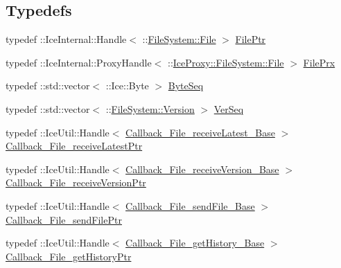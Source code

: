 \subsection*{Typedefs}
\begin{DoxyCompactItemize}
\item 
typedef \+::Ice\+Internal\+::\+Handle$<$ \+::\hyperlink{class_file_system_1_1_file}{File\+System\+::\+File} $>$ \hyperlink{namespace_file_system_a322304ec4ae6dc6308f79d49662764bb}{File\+Ptr}
\item 
typedef \+::Ice\+Internal\+::\+Proxy\+Handle$<$ \+::\hyperlink{class_ice_proxy_1_1_file_system_1_1_file}{Ice\+Proxy\+::\+File\+System\+::\+File} $>$ \hyperlink{namespace_file_system_a2cca5b42d5ab231d91dd889d4d74218c}{File\+Prx}
\item 
typedef \+::std\+::vector$<$ \+::Ice\+::\+Byte $>$ \hyperlink{namespace_file_system_a5c85de065f9c451ae1d1dea2dacb68c5}{Byte\+Seq}
\item 
typedef \+::std\+::vector$<$ \+::\hyperlink{struct_file_system_1_1_version}{File\+System\+::\+Version} $>$ \hyperlink{namespace_file_system_ac32dc1eb34c060160b52edc7c4e37d6e}{Ver\+Seq}
\item 
typedef \+::Ice\+Util\+::\+Handle$<$ \hyperlink{class_file_system_1_1_callback___file__receive_latest___base}{Callback\+\_\+\+File\+\_\+receive\+Latest\+\_\+\+Base} $>$ \hyperlink{namespace_file_system_a86fe38e325e02ddd26f665f486d51837}{Callback\+\_\+\+File\+\_\+receive\+Latest\+Ptr}
\item 
typedef \+::Ice\+Util\+::\+Handle$<$ \hyperlink{class_file_system_1_1_callback___file__receive_version___base}{Callback\+\_\+\+File\+\_\+receive\+Version\+\_\+\+Base} $>$ \hyperlink{namespace_file_system_a9f139d463637347415d1d3dadefe9bad}{Callback\+\_\+\+File\+\_\+receive\+Version\+Ptr}
\item 
typedef \+::Ice\+Util\+::\+Handle$<$ \hyperlink{class_file_system_1_1_callback___file__send_file___base}{Callback\+\_\+\+File\+\_\+send\+File\+\_\+\+Base} $>$ \hyperlink{namespace_file_system_aa10040959d9776f7f500f38a2567b56e}{Callback\+\_\+\+File\+\_\+send\+File\+Ptr}
\item 
typedef \+::Ice\+Util\+::\+Handle$<$ \hyperlink{class_file_system_1_1_callback___file__get_history___base}{Callback\+\_\+\+File\+\_\+get\+History\+\_\+\+Base} $>$ \hyperlink{namespace_file_system_a9dca00d90979e9c64452fc4123feed8e}{Callback\+\_\+\+File\+\_\+get\+History\+Ptr}
\end{DoxyCompactItemize}
